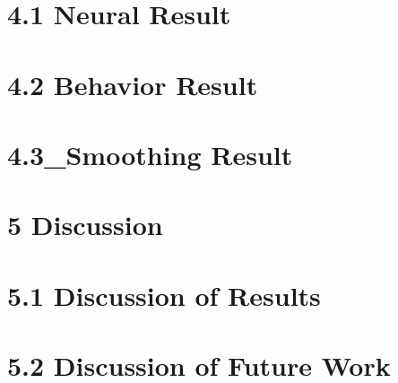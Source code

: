 \documentclass[11pt]{article}
\begin{document}
    \section{4.1 Neural Result}
            
            
    \section{4.2 Behavior Result}
            
            
    \section{4.3_Smoothing Result}
            

\section{5 Discussion}

    \section{5.1 Discussion of Results}
            

    \section{5.2 Discussion of Future Work}
            


\end{document}
